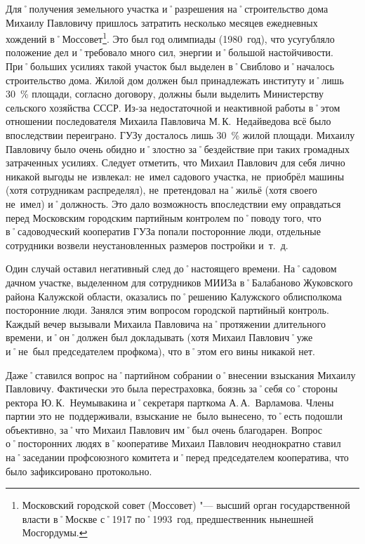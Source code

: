 Для˚получения земельного участка и˚разрешения на˚строительство дома Михаилу Павловичу пришлось затратить несколько месяцев ежедневных хождений в˚Моссовет\footnote{Московский городской совет (Моссовет) "--- высший орган государственной власти в˚Москве с˚1917 по˚1993~год, предшественник нынешней Мосгордумы.}. Это был год олимпиады (1980~год), что усугубляло положение дел и˚требовало много сил, энергии и˚большой настойчивости. При˚больших усилиях такой участок был выделен в˚Свиблово и˚началось строительство дома. Жилой дом должен был принадлежать институту и˚лишь 30~\% площади, согласно договору, должны были выделить Министерству сельского хозяйства СССР. Из-за недостаточной и неактивной работы в˚этом отношении последователя Михаила Павловича М.\,К.~Недайведова всё было впоследствии переиграно. ГУЗу досталось лишь 30~\% жилой площади. Михаилу Павловичу было очень обидно и˚злостно за˚бездействие при таких громадных затраченных усилиях. Следует отметить, что Михаил Павлович для себя лично никакой выгоды не~извлекал: не~имел садового участка, не~приобрёл машины (хотя сотрудникам распределял), не~претендовал на˚жильё (хотя своего не~имел) и˚должность. Это дало возможность впоследствии ему оправдаться перед Московским городским партийным контролем по˚поводу того, что в˚садоводческий кооператив ГУЗа попали посторонние люди, отдельные сотрудники возвели неустановленных размеров постройки и~т.~д. 

Один случай оставил негативный след до˚настоящего времени. На˚садовом дачном участке, выделенном для сотрудников МИИЗа в˚Балабаново Жуковского района Калужской области, оказались по˚решению Калужского облисполкома посторонние люди. Занялся этим вопросом городской партийный контроль. Каждый вечер вызывали Михаила Павловича на˚протяжении длительного времени, и˚он˚должен был докладывать (хотя Михаил Павлович˚уже и˚не~был председателем профкома), что в˚этом его вины никакой нет.

Даже˚ставился вопрос на˚партийном собрании о˚внесении взыскания Михаилу Павловичу. Фактически это была перестраховка, боязнь за˚себя со˚стороны ректора Ю.\,К.~Неумывакина и˚секретаря парткома А.\,А.~Варламова. Члены партии это не~поддерживали, взыскание не~было вынесено, то˚есть подошли объективно, за˚что Михаил Павлович им˚был очень благодарен. Вопрос о˚посторонних людях в˚кооперативе Михаил Павлович неоднократно ставил на˚заседании профсоюзного комитета и˚перед председателем кооператива, что было зафиксировано протокольно.

